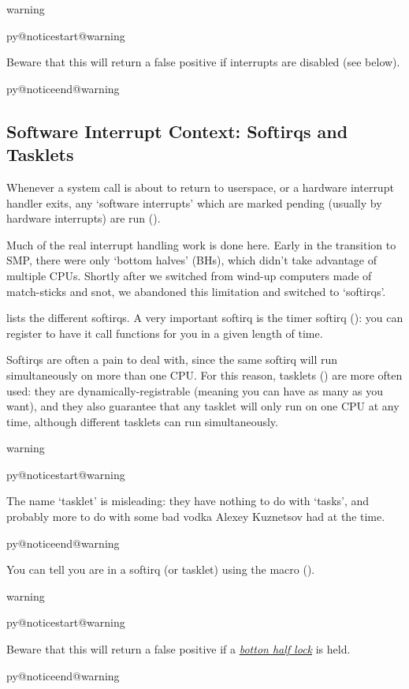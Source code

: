 \documentclass[a4paper,8pt,english]{sphinxmanual}
\makeatletter
\renewenvironment{notice}[2]{%
          \def\py@noticetype{#1}
          \begin{coloredbox}{#1}
          \bf\it
          \par\strong{#2}
          \csname py@noticestart@#1\endcsname
        }
	{
          \csname py@noticeend@\py@noticetype\endcsname
          \end{coloredbox}
        }
\makeatother
\begin{document}
\begin{notice}{warning}{Warning:}
Beware that this will return a false positive if interrupts are
disabled (see below).
\end{notice}


\subsection{Software Interrupt Context: Softirqs and Tasklets}
\label{kernel-hacking/hacking:software-interrupt-context-softirqs-and-tasklets}
Whenever a system call is about to return to userspace, or a hardware
interrupt handler exits, any `software interrupts' which are marked
pending (usually by hardware interrupts) are run ().

Much of the real interrupt handling work is done here. Early in the
transition to SMP, there were only `bottom halves' (BHs), which didn't
take advantage of multiple CPUs. Shortly after we switched from wind-up
computers made of match-sticks and snot, we abandoned this limitation
and switched to `softirqs'.

 lists the different softirqs. A very
important softirq is the timer softirq (): you
can register to have it call functions for you in a given length of
time.

Softirqs are often a pain to deal with, since the same softirq will run
simultaneously on more than one CPU. For this reason, tasklets
() are more often used: they are
dynamically-registrable (meaning you can have as many as you want), and
they also guarantee that any tasklet will only run on one CPU at any
time, although different tasklets can run simultaneously.

\begin{notice}{warning}{Warning:}
The name `tasklet' is misleading: they have nothing to do with
`tasks', and probably more to do with some bad vodka Alexey
Kuznetsov had at the time.
\end{notice}

You can tell you are in a softirq (or tasklet) using the
 macro ().

\begin{notice}{warning}{Warning:}
Beware that this will return a false positive if a
{\hyperref[kernel\string-hacking/hacking:local\string-bh\string-disable]{\emph{botton half lock}}} is held.
\end{notice}
\end{document}
